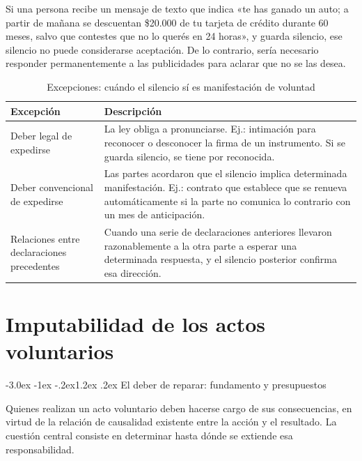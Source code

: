 \documentclass[12pt,oneside]{book}
\makeatletter
\renewcommand\section{\@startsection{section}{1}{\z@}%
  {-3.0ex \@plus -1ex \@minus -.2ex}{1.2ex \@plus .2ex}%
  {\normalfont\large\bfseries\color{acento}}}
\makeatother
\begin{document}
\begin{ejemplo}
Si una persona recibe un mensaje de texto que indica «te has ganado un auto; a partir de mañana se descuentan \$20.000 de tu tarjeta de crédito durante 60 meses, salvo que contestes que no lo querés en 24 horas», y guarda silencio, ese silencio no puede considerarse aceptación. De lo contrario, sería necesario responder permanentemente a las publicidades para aclarar que no se las desea.
\end{ejemplo}

\begin{table}[H]
\centering
\caption{Excepciones: cuándo el silencio sí es manifestación de voluntad}
\begin{tabularx}{\textwidth}{l X}
\toprule
\textbf{Excepción} & \textbf{Descripción} \\
\midrule
Deber legal de expedirse & La ley obliga a pronunciarse. Ej.: intimación para reconocer o desconocer la firma de un instrumento. Si se guarda silencio, se tiene por reconocida. \\
Deber convencional de expedirse & Las partes acordaron que el silencio implica determinada manifestación. Ej.: contrato que establece que se renueva automáticamente si la parte no comunica lo contrario con un mes de anticipación. \\
Relaciones entre declaraciones precedentes & Cuando una serie de declaraciones anteriores llevaron razonablemente a la otra parte a esperar una determinada respuesta, y el silencio posterior confirma esa dirección. \\
\bottomrule
\end{tabularx}
\end{table}


\chapter{Imputabilidad de los actos voluntarios}
\section{El deber de reparar: fundamento y presupuestos}

Quienes realizan un acto voluntario deben hacerse cargo de sus consecuencias, en virtud de la relación de causalidad existente entre la acción y el resultado. La cuestión central consiste en determinar hasta dónde se extiende esa responsabilidad.
\end{document}
